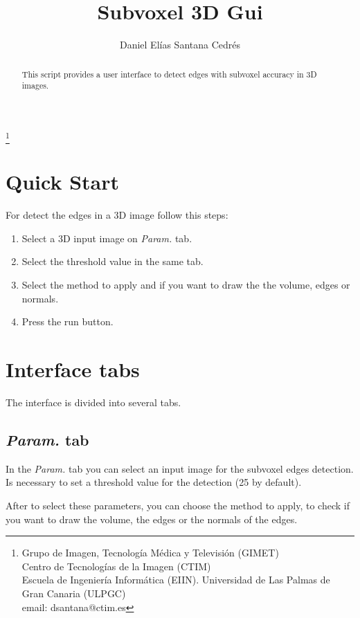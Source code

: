 \documentclass{article}
\begin{document}
\title{Subvoxel 3D Gui}
\author{Daniel El\'ias Santana Cedr\'es}
\thanks{
Grupo de Imagen, Tecnolog\'ia M\'edica y Televisi\'on (GIMET)\\
Centro de Tecnolog\'ias de la Imagen (CTIM)\\
Escuela de Ingenier\'ia Inform\'atica (EIIN). Universidad de Las Palmas de Gran Canaria (ULPGC)\\
email: dsantana@ctim.es
}


\maketitle

\begin{abstract}
This script provides a user interface to detect edges with subvoxel accuracy in 3D images.
\end{abstract}


\section{Quick Start}

For detect the edges in a 3D image follow this steps:
\begin{enumerate}
  \item Select a 3D input image on \emph{Param.} tab.
  \item Select the threshold value in the same tab.
  \item Select the method to apply and if you want to draw the the volume, edges or normals.
  \item Press the run button.
\end{enumerate}

\section{Interface tabs}

The interface is divided into several tabs.

\subsection{\emph{Param.} tab}
In the \emph{Param.} tab you can select an input image for the subvoxel edges detection. Is necessary to set a threshold value for the detection (25 by default).

After to select these parameters, you can choose the method to apply, to check if you want to draw the volume, the edges or the normals of the edges.
\end{document}
